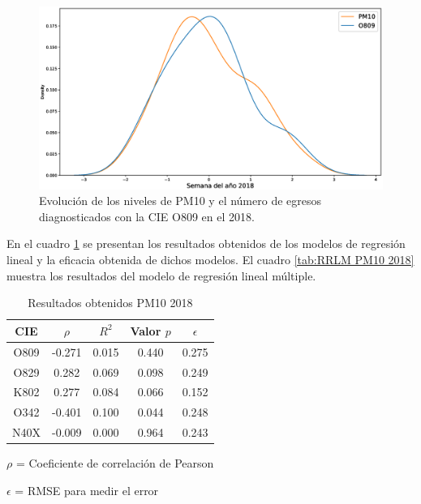 \begin{figure}[h!]
\setcounter{figure}{1} %
\captionsetup{type=figure} %
\begin{center}
   \includegraphics[width=1\textwidth]{PM10_O809_2018.eps}
   \end{center}
    \caption[Series de tiempo 2018 PM10 Y O809]{Evolución de los niveles de PM10 y el número de egresos diagnosticados con la CIE O809 en el 2018.}
    \label{serie_de_tiempo_2018_PM10}
\end{figure}

En el cuadro \ref{tab:Resultados obtenidos PM10 2018} se presentan los resultados obtenidos de los modelos de regresión lineal y la eficacia obtenida de dichos modelos. El cuadro \ref{tab:RRLM PM10 2018} muestra los resultados del modelo de regresión lineal múltiple.

\begin{table}[hbt!]
\centering
\caption{Resultados obtenidos PM10 2018}
\label{tab:Resultados obtenidos PM10 2018}
\vspace{0.5cm}
\begin{threeparttable}
\begin{tabular}{|c|c|c|c|c|}
	\hline
	CIE & $\rho$ & $R^2$ & Valor $p$ & $\epsilon$\\
	\hline
	O809 & -0.271 & 0.015 & 0.440 & 0.275 \\
	\hline
	O829 & 0.282 & 0.069 & 0.098 & 0.249 \\
	\hline
	K802 & 0.277 & 0.084 & 0.066 & 0.152 \\
	\hline
	O342 & -0.401 & 0.100 & 0.044 & 0.248 \\
	\hline
	N40X & -0.009 & 0.000 & 0.964 & 0.243 \\
	\hline
\end{tabular}
\begin{tablenotes}
\footnotesize
\item{$\rho$ = Coeficiente de correlación de Pearson}
\item{$\epsilon$ = RMSE para medir el error}
\end{tablenotes}
\end{threeparttable}
\end{table}

